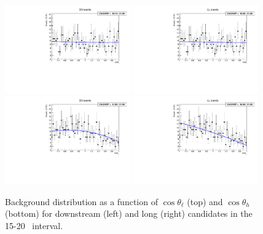 \begin{figure}[h]
\centering
\includegraphics[width=0.48\textwidth]{Lmumu/figs/AngularBkgFits/BkgFit_highq2_DD.pdf}
\includegraphics[width=0.48\textwidth]{Lmumu/figs/AngularBkgFits/BkgFit_highq2_LL.pdf}
\includegraphics[width=0.48\textwidth]{Lmumu/figs/AngularBkgFits/BkgFitB_highq2_DD.pdf}
\includegraphics[width=0.48\textwidth]{Lmumu/figs/AngularBkgFits/BkgFitB_highq2_LL.pdf}
\caption{Background distribution as a function of $\cos\theta_\ell$ (top) and $\cos\theta_h$ (bottom)
for downstream (left) and long (right) candidates in the 15-20 \gevgevcccc ~\qsq interval.  }
\label{fig:cosThetaLbkg}
\end{figure}



